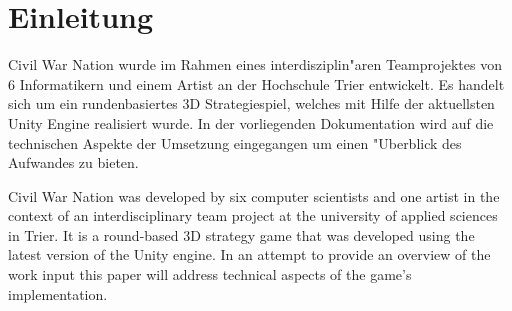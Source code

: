 \chapter{Einleitung}

Civil War Nation wurde im Rahmen eines interdisziplin"aren Teamprojektes von 6 Informatikern und einem Artist an der Hochschule Trier entwickelt. Es handelt sich um ein rundenbasiertes 3D Strategiespiel, welches mit Hilfe der aktuellsten Unity Engine realisiert wurde. 
In der vorliegenden Dokumentation wird auf die technischen Aspekte der Umsetzung eingegangen um einen "Uberblick des Aufwandes zu bieten. \newline

Civil War Nation was developed by six computer scientists and one artist in the context of an interdisciplinary team project at the university of applied sciences in Trier. It is a round-based 3D strategy game that was developed using the latest version of the Unity engine. In an attempt to provide an overview of the work input this paper will address technical aspects of the game's implementation.
